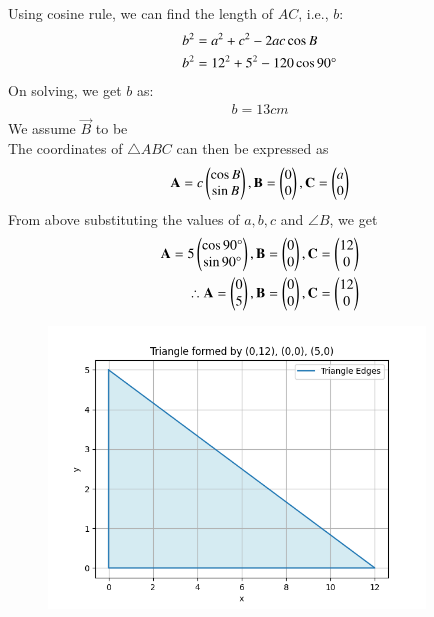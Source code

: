 \documentclass[journal]{IEEEtran}
\begin{document}
\begin{table}[h!]
      \centering
      
      \caption{}
\end{table}
Using cosine rule, we can find the length of $AC$, i.e., ${b}$:
\begin{align}
    b^2 &= a^2 + c^2 - 2ac\cos{B}\\
    b^2 &= 12^2 + 5^2 - 120\cos{90\degree}
\end{align}
On solving, we get ${b}$ as:
\begin{align}
    {b} = 13cm
\end{align}
We assume $\vec{B}$ to be  \\
The coordinates of $\triangle ABC$ can then be expressed as
\begin{align}
    \mathbf{A} = c\begin{pmatrix}\cos{B} \\ \sin{B}\end{pmatrix}, \mathbf{B} = \begin{pmatrix}0 \\ 0\end{pmatrix}, \mathbf{C} = \begin{pmatrix}a \\ 0\end{pmatrix}
    \end{align}
    From above substituting the values of $a, b, c$ and $\angle{B}$, we get 
  \begin{align}
     \mathbf{A} = 5\begin{pmatrix}\cos{90\degree} \\ \sin{90\degree}\end{pmatrix}, \mathbf{B} = \begin{pmatrix}0 \\ 0\end{pmatrix}, \mathbf{C} = \begin{pmatrix} 12\\ 0\end{pmatrix} \\
    \therefore \mathbf{A} = \begin{pmatrix}0 \\ 5\end{pmatrix}, \mathbf{B} = \begin{pmatrix}0 \\ 0\end{pmatrix}, \mathbf{C} = \begin{pmatrix} 12\\ 0\end{pmatrix}   
\end{align}
\begin{figure}
    \centering
    \includegraphics[width=10cm]{figs/fig.png}
    \caption{}
    \label{fig:enter-label}
\end{figure}
\end{document}
